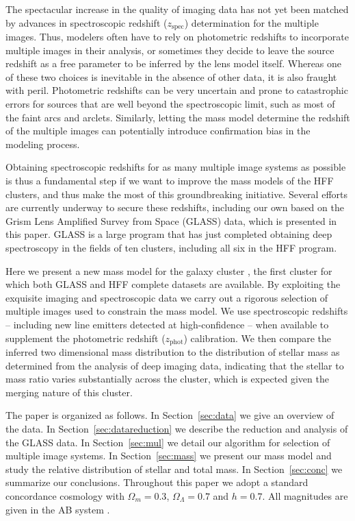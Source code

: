 The spectacular increase in the quality of imaging data has
not yet been matched by advances in spectroscopic redshift ($z_{\textrm{spec}}$)
determination for the multiple images. Thus, modelers often have to
rely on photometric redshifts to incorporate multiple images in their
analysis, or sometimes they decide to leave the source redshift as a
free parameter to be inferred by the lens model itself. Whereas one
of these two choices is inevitable in the absence of other data, it is
also fraught with peril. Photometric redshifts can be very uncertain
and prone to catastrophic errors for sources that are well beyond the
spectroscopic limit, such as most of the faint arcs and
arclets. Similarly, letting the mass model determine the redshift of
the multiple images can potentially introduce confirmation bias in the
modeling process.

Obtaining spectroscopic redshifts for as many multiple image systems
as possible is thus a fundamental step if we want to improve the mass
models of the HFF clusters, and thus make the most of this
groundbreaking initiative. Several efforts are currently underway to
secure these redshifts, including our own based on the Grism Lens
Amplified Survey from Space (GLASS) data, which is presented in this paper. GLASS
is a large \hst program that has just completed obtaining deep spectroscopy in the fields of ten clusters,
including all six in the HFF program.

Here we present a new mass model for the galaxy cluster
\cler, the first cluster for which both GLASS and HFF complete
datasets are available. By exploiting the exquisite imaging and
spectroscopic data we carry out a rigorous selection of multiple
images used to constrain the mass model. We use spectroscopic redshifts
-- including \NELobjsQhi new line emitters detected at high-confidence -- when available to supplement the
photometric redshift ($z_{\textrm{phot}}$) calibration. We then compare the inferred two
dimensional mass distribution to the distribution of stellar mass as
determined from the analysis of deep \spitzer imaging data, indicating that the stellar to mass ratio
varies substantially across the cluster, which is expected given the merging nature of this cluster. 

The paper is organized as follows. In Section~\ref{sec:data} we give
an overview of the data. In Section~\ref{sec:datareduction} we
describe the reduction and analysis of the GLASS data. In
Section~\ref{sec:mul} we detail our algorithm for selection of
multiple image systems. In Section~\ref{sec:mass} we present our mass
model and study the relative distribution of stellar and total mass. In
Section~\ref{sec:conc} we summarize our conclusions. Throughout this
paper we adopt a standard concordance cosmology with $\Omega_m=0.3$,
$\Omega_{\Lambda}=0.7$ and $h=0.7$. All magnitudes are given in the AB
system \citep{Oke74}.


